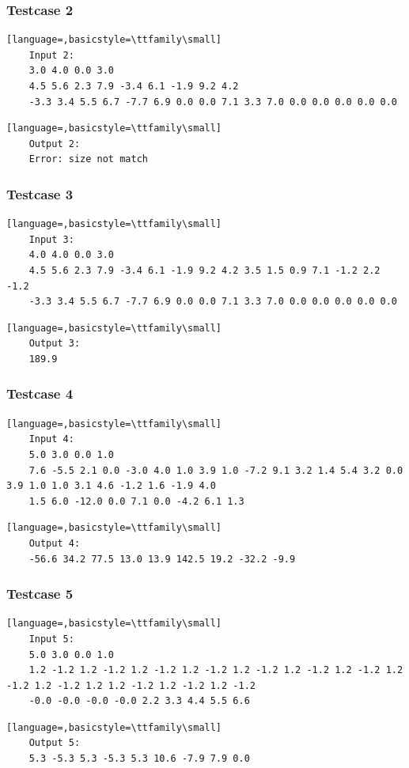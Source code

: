 \documentclass{article}
\begin{document}
\subsubsection{Testcase 2}
\begin{lstlisting}[language=,basicstyle=\ttfamily\small]
	Input 2:
	3.0 4.0 0.0 3.0
	4.5 5.6 2.3 7.9 -3.4 6.1 -1.9 9.2 4.2
	-3.3 3.4 5.5 6.7 -7.7 6.9 0.0 0.0 7.1 3.3 7.0 0.0 0.0 0.0 0.0 0.0
\end{lstlisting}
\begin{lstlisting}[language=,basicstyle=\ttfamily\small]
	Output 2:
	Error: size not match
\end{lstlisting}
\subsubsection{Testcase 3}
\begin{lstlisting}[language=,basicstyle=\ttfamily\small]
	Input 3:
	4.0 4.0 0.0 3.0
	4.5 5.6 2.3 7.9 -3.4 6.1 -1.9 9.2 4.2 3.5 1.5 0.9 7.1 -1.2 2.2 -1.2
	-3.3 3.4 5.5 6.7 -7.7 6.9 0.0 0.0 7.1 3.3 7.0 0.0 0.0 0.0 0.0 0.0
\end{lstlisting}
\begin{lstlisting}[language=,basicstyle=\ttfamily\small]
	Output 3:
	189.9
\end{lstlisting}
\subsubsection{Testcase 4}
\begin{lstlisting}[language=,basicstyle=\ttfamily\small]
	Input 4:
	5.0 3.0 0.0 1.0
	7.6 -5.5 2.1 0.0 -3.0 4.0 1.0 3.9 1.0 -7.2 9.1 3.2 1.4 5.4 3.2 0.0 3.9 1.0 1.0 3.1 4.6 -1.2 1.6 -1.9 4.0
	1.5 6.0 -12.0 0.0 7.1 0.0 -4.2 6.1 1.3
\end{lstlisting}
\begin{lstlisting}[language=,basicstyle=\ttfamily\small]
	Output 4:
	-56.6 34.2 77.5 13.0 13.9 142.5 19.2 -32.2 -9.9
\end{lstlisting}
\subsubsection{Testcase 5}
\begin{lstlisting}[language=,basicstyle=\ttfamily\small]
	Input 5:
	5.0 3.0 0.0 1.0
	1.2 -1.2 1.2 -1.2 1.2 -1.2 1.2 -1.2 1.2 -1.2 1.2 -1.2 1.2 -1.2 1.2 -1.2 1.2 -1.2 1.2 1.2 -1.2 1.2 -1.2 1.2 -1.2
	-0.0 -0.0 -0.0 -0.0 2.2 3.3 4.4 5.5 6.6
\end{lstlisting}
\begin{lstlisting}[language=,basicstyle=\ttfamily\small]
	Output 5:
	5.3 -5.3 5.3 -5.3 5.3 10.6 -7.9 7.9 0.0
\end{lstlisting}
\end{document}
